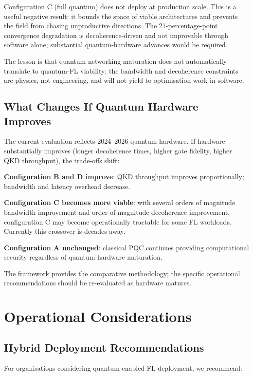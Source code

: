 \documentclass[sigconf,nonacm]{acmart}
\begin{document}
Configuration C (full quantum) does not deploy at production
scale. This is a useful negative result: it bounds the space of
viable architectures and prevents the field from chasing
unproductive directions. The 21-percentage-point convergence
degradation is decoherence-driven and not improvable through
software alone; substantial quantum-hardware advances would be
required.

The lesson is that quantum networking maturation does not
automatically translate to quantum-FL viability; the bandwidth
and decoherence constraints are physics, not engineering, and
will not yield to optimisation work in software.

\subsection{What Changes If Quantum Hardware Improves}

The current evaluation reflects 2024--2026 quantum hardware. If
hardware substantially improves (longer decoherence times, higher
gate fidelity, higher QKD throughput), the trade-offs shift:

\textbf{Configuration B and D improve}: QKD throughput improves
proportionally; bandwidth and latency overhead decrease.

\textbf{Configuration C becomes more viable}: with several orders
of magnitude bandwidth improvement and order-of-magnitude
decoherence improvement, configuration C may become
operationally tractable for some FL workloads. Currently this
crossover is decades away.

\textbf{Configuration A unchanged}: classical PQC continues
providing computational security regardless of quantum-hardware
maturation.

The framework provides the comparative methodology; the
specific operational recommendations should be re-evaluated as
hardware matures.

\section{Operational Considerations}

\subsection{Hybrid Deployment Recommendations}

For organisations considering quantum-enabled FL deployment, we
recommend:
\end{document}
